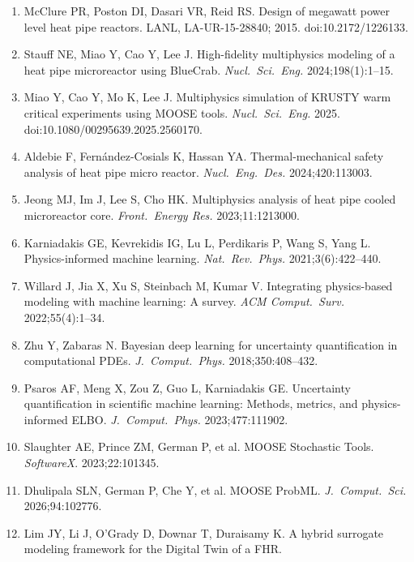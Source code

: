 \documentclass[11pt,a4paper]{article}
\begin{document}
\begin{enumerate}\small
\item McClure PR, Poston DI, Dasari VR, Reid RS. Design of megawatt
      power level heat pipe reactors. LANL, LA-UR-15-28840; 2015.
      doi:10.2172/1226133.
\item Stauff NE, Miao Y, Cao Y, Lee J. High-fidelity multiphysics
      modeling of a heat pipe microreactor using BlueCrab.
      \textit{Nucl.\ Sci.\ Eng.} 2024;198(1):1--15.
\item Miao Y, Cao Y, Mo K, Lee J. Multiphysics simulation of KRUSTY
      warm critical experiments using MOOSE tools.
      \textit{Nucl.\ Sci.\ Eng.} 2025. doi:10.1080/00295639.2025.2560170.
\item Aldebie F, Fern{\'a}ndez-Cosials K, Hassan YA. Thermal-mechanical
      safety analysis of heat pipe micro reactor. \textit{Nucl.\ Eng.\
      Des.} 2024;420:113003.
\item Jeong MJ, Im J, Lee S, Cho HK. Multiphysics analysis of heat pipe
      cooled microreactor core. \textit{Front.\ Energy Res.}
      2023;11:1213000.
\item Karniadakis GE, Kevrekidis IG, Lu L, Perdikaris P, Wang S, Yang L.
      Physics-informed machine learning. \textit{Nat.\ Rev.\ Phys.}
      2021;3(6):422--440.
\item Willard J, Jia X, Xu S, Steinbach M, Kumar V. Integrating
      physics-based modeling with machine learning: A survey. \textit{ACM
      Comput.\ Surv.} 2022;55(4):1--34.
\item Zhu Y, Zabaras N. Bayesian deep learning for uncertainty
      quantification in computational PDEs. \textit{J.\ Comput.\ Phys.}
      2018;350:408--432.
\item Psaros AF, Meng X, Zou Z, Guo L, Karniadakis GE. Uncertainty
      quantification in scientific machine learning: Methods, metrics,
      and physics-informed ELBO. \textit{J.\ Comput.\ Phys.}
      2023;477:111902.
\item Slaughter AE, Prince ZM, German P, et al. MOOSE Stochastic Tools.
      \textit{SoftwareX}. 2023;22:101345.
\item Dhulipala SLN, German P, Che Y, et al. MOOSE ProbML.
      \textit{J.\ Comput.\ Sci.} 2026;94:102776.
\item Lim JY, Li J, O'Grady D, Downar T, Duraisamy K. A hybrid
      surrogate modeling framework for the Digital Twin of a FHR.

\end{enumerate}
\end{document}
